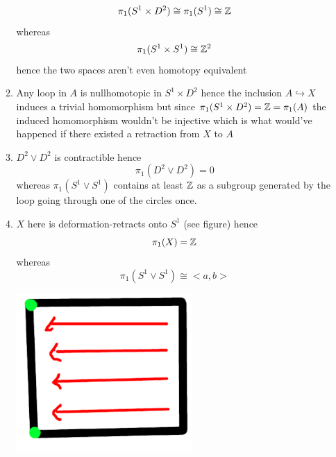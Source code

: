 \documentclass{pset}
\begin{document}
\begin{problem}
\begin{enumerate}[label=1.1.\arabic*]
\begin{enumerate}
            \[\pi_1(S^1 \times D^2) \cong \pi_1(S^1) \cong \mathbb{Z}\]
            whereas
            \[\pi_1(S^1 \times S^1) \cong \mathbb{Z}^2\]
            hence the two spaces aren't even homotopy equivalent
            \item Any loop in $A$ is nullhomotopic in $S^1 \times D^2$ hence the inclusion $A \hookrightarrow X$ induces a trivial homomorphism but since $\pi_1(S^1 \times D^2) = \mathbb{Z} = \pi_1(A)$ the induced homomorphism wouldn't be injective which is what would've happened if there existed a retraction from $X$ to $A$
            \item $D^2 \vee D^2$ is contractible hence
            \[\pi_1(D^2 \vee D^2) = 0\]
            whereas $\pi_1(S^1 \vee S^1)$ contains at least $\mathbb{Z}$ as a subgroup generated by the loop going through one of the circles once.
            \item $X$ here is deformation-retracts onto $S^1$ (see figure) hence
            \[\pi_1(X) = \mathbb{Z}\]
            whereas 
            \[\pi_1(S^1 \vee S^1) \cong <a, b>\]
            
            \centering
            \includegraphics[width=6 cm]{deformation.png}


\end{enumerate}
\end{enumerate}
\end{problem}
\end{document}
